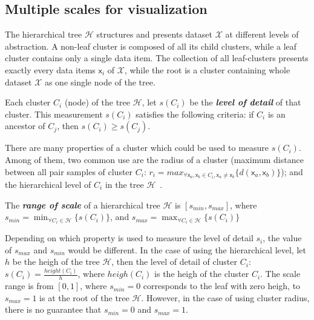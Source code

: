 \subsection{Multiple scales for visualization}
\label{subsec:multiple_scales}
The hierarchical tree $\mathcal{H}$ structures and presents dataset $\mathcal{X}$ at different levels of abstraction. A non-leaf cluster is composed of all its child clusters, while a leaf cluster contains only a single data item. The collection of all leaf-clusters presents exactly every data items $\mathsf{x}_i$ of $\mathcal{X}$, while the root is a cluster containing whole dataset $\mathcal{X}$ as one single node of the tree.
\begin{definition}
\label{def:level_detail}
Each cluster $C_i$ (node) of the tree $\mathcal{H}$, let $s(C_i)$ be the \textbf{\textit{level of detail}} of that cluster. This measurement $s(C_i)$ satisfies the following criteria: if $C_i$ is an ancestor of $C_j$, then $s(C_i) \geq s(C_j)$. 
\end{definition}
There are many properties of a cluster which could be used to measure $s(C_i)$. Among of them, two common use are the radius of a cluster (maximum distance between all pair samples of cluster $C_i$: $r_i = max_{\forall \mathsf{x}_a, \mathsf{x}_b
 \in C_i, \mathsf{x}_a \neq \mathsf{x}_b} \{d(\mathsf{x}_a,\mathsf{x}_b)\}$); and the hierarchical level of $C_i$ in the tree $\mathcal{H}$~\cite{yang2003interactive}.

\begin{definition}
\label{def:range_scale}
 The \textbf{\textit{range of scale}} of a hierarchical tree $\mathcal{H}$ is $[s_{min},s_{max}]$, where $s_{min} = \min_{\forall C_i \in \mathcal{H}}\{s(C_i)\}$, and $s_{max} = \max_{\forall C_i \in \mathcal{H}}\{s(C_i)\}$
\end{definition}
Depending on which property is used to measure the level of detail $s_i$, the value of  $s_{max}$ and  $s_{min}$ would be different. In the case of using the hierarchical level, let $h$ be the heigh of the tree $\mathcal{H}$, then the level of detail of cluster $C_i$: $s(C_i) = \frac{height(C_i)}{h}$, where $heigh(C_i)$ is the heigh of the cluster $C_i$. The scale range is from $[0,1]$, where $s_{min} = 0$ corresponds to the leaf with zero heigh, to $s_{max} = 1$ is at the root of the tree $\mathcal{H}$. However, in the case of using cluster radius, there is no guarantee that $s_{min} = 0$ and $s_{max} = 1$.

